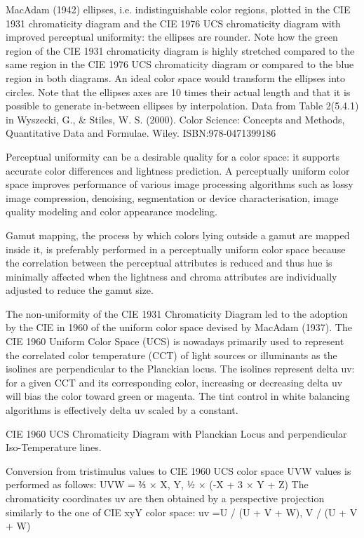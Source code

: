 MacAdam (1942) ellipses, i.e. indistinguishable color regions, plotted in the CIE 1931 chromaticity diagram and the CIE 1976 UCS chromaticity diagram with improved perceptual uniformity: the ellipses are rounder. Note how the green region of the CIE 1931 chromaticity diagram is highly stretched compared to the same region in the CIE 1976 UCS chromaticity diagram or compared to the blue region in both diagrams. An ideal color space would transform the ellipses into circles. Note that the ellipses axes are 10 times their actual length and that it is possible to generate in-between ellipses by interpolation. Data from Table 2(5.4.1) in Wyszecki, G., & Stiles, W. S. (2000). Color Science: Concepts and Methods, Quantitative Data and Formulae. Wiley. ISBN:978-0471399186

Perceptual uniformity can be a desirable quality for a color space: it supports accurate color differences and lightness prediction. A perceptually uniform color space improves performance of various image processing algorithms such as lossy image compression, denoising, segmentation or device characterisation, image quality modeling and color appearance modeling.

Gamut mapping, the process by which colors lying outside a gamut are mapped inside it, is preferably performed in a perceptually uniform color space because the correlation between the perceptual attributes is reduced and thus hue is minimally affected when the lightness and chroma attributes are individually adjusted to reduce the gamut size.

The non-uniformity of the CIE 1931 Chromaticity Diagram led to the adoption by the CIE in 1960 of the uniform color space devised by MacAdam (1937). The CIE 1960 Uniform Color Space (UCS) is nowadays primarily used to represent the correlated color temperature (CCT) of light sources or illuminants as the isolines are perpendicular to the Planckian locus. The isolines represent delta uv: for a given CCT and its corresponding color, increasing or decreasing delta uv will bias the color toward green or magenta. The tint control in white balancing algorithms is effectively delta uv scaled by a constant.

CIE 1960 UCS Chromaticity Diagram with Planckian Locus and perpendicular Iso-Temperature lines.

Conversion from tristimulus values to CIE 1960 UCS color space UVW values is performed as follows:
UVW = ⅔ × X, Y, ½ × (-X + 3 × Y + Z)
The chromaticity coordinates uv are then obtained by a perspective projection similarly to the one of CIE xyY color space:
uv =U / (U + V + W), V / (U + V + W)

